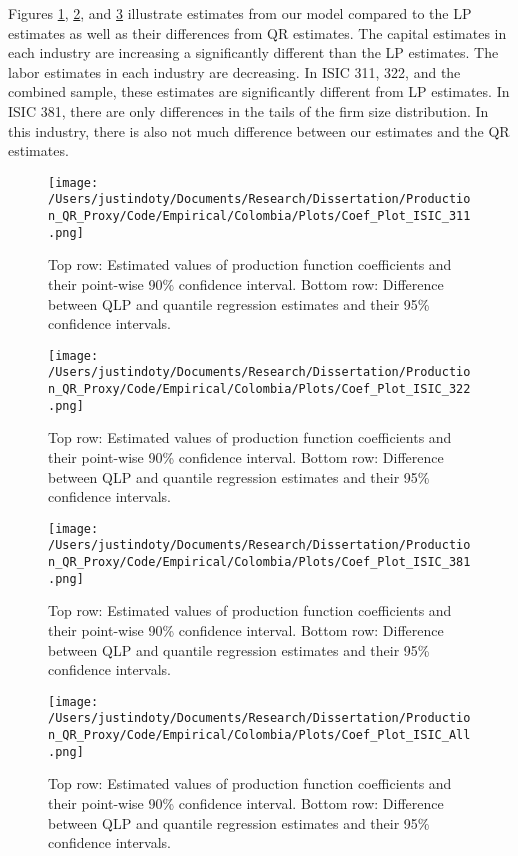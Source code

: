 \documentclass[11pt]{article}
\begin{document}
Figures \ref{fig:COL311}, \ref{fig:COL321}, and \ref{fig:COL381} illustrate estimates from our model compared to the LP estimates as well as their differences from QR estimates. The capital estimates in each industry are increasing a significantly different than the LP estimates. The labor estimates in each industry are decreasing. In ISIC 311, 322, and the combined sample, these estimates are significantly different from LP estimates. In ISIC 381, there are only differences in the tails of the firm size distribution. In this industry, there is also not much difference between our estimates and the QR estimates.

\begin{figure}[H]
\centering
\texttt{[image: /Users/justindoty/Documents/Research/Dissertation/Production\_QR\_Proxy/Code/Empirical/Colombia/Plots/Coef\_Plot\_ISIC\_311.png]}
\caption{Top row: Estimated values of production function coefficients and their point-wise 90\% confidence interval. Bottom row: Difference between QLP and quantile regression estimates and their 95\% confidence intervals.}
\label{fig:COL311}
\end{figure}

\begin{figure}[H]
\centering
\texttt{[image: /Users/justindoty/Documents/Research/Dissertation/Production\_QR\_Proxy/Code/Empirical/Colombia/Plots/Coef\_Plot\_ISIC\_322.png]}
\caption{Top row: Estimated values of production function coefficients and their point-wise 90\% confidence interval. Bottom row: Difference between QLP and quantile regression estimates and their 95\% confidence intervals.}
\label{fig:COL321}
\end{figure}

\begin{figure}[H]
\centering
\texttt{[image: /Users/justindoty/Documents/Research/Dissertation/Production\_QR\_Proxy/Code/Empirical/Colombia/Plots/Coef\_Plot\_ISIC\_381.png]}
\caption{Top row: Estimated values of production function coefficients and their point-wise 90\% confidence interval. Bottom row: Difference between QLP and quantile regression estimates and their 95\% confidence intervals.}
\label{fig:COL381}
\end{figure}

\begin{figure}[H]
\centering
\texttt{[image: /Users/justindoty/Documents/Research/Dissertation/Production\_QR\_Proxy/Code/Empirical/Colombia/Plots/Coef\_Plot\_ISIC\_All.png]}
\caption{Top row: Estimated values of production function coefficients and their point-wise 90\% confidence interval. Bottom row: Difference between QLP and quantile regression estimates and their 95\% confidence intervals.}
\label{fig:COLall}
\end{figure}
\end{document}
